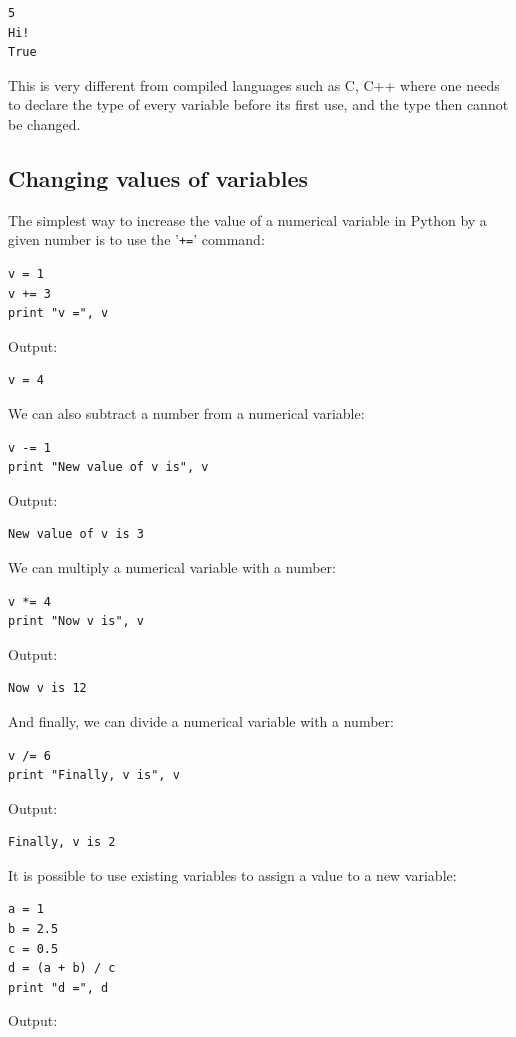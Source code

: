 \begin{verbatim}
5
Hi!
True
\end{verbatim}
This is very different from compiled languages such as C, C++ where one needs to declare the type 
of every variable before its first use, and the type then cannot be changed. 

\subsection{Changing values of variables}

The simplest way to increase the value of a numerical variable in Python by a given number 
is to use the '{\tt +=}' command:

\begin{verbatim}
v = 1
v += 3
print "v =", v
\end{verbatim}
Output:

\begin{verbatim}
v = 4
\end{verbatim}
We can also subtract a number from a numerical variable:

\begin{verbatim}
v -= 1
print "New value of v is", v
\end{verbatim}
Output:

\begin{verbatim}
New value of v is 3
\end{verbatim}
We can multiply a numerical variable with a number:

\begin{verbatim}
v *= 4
print "Now v is", v
\end{verbatim}
Output:

\begin{verbatim}
Now v is 12
\end{verbatim}
And finally, we can divide a numerical variable with a number:

\begin{verbatim}
v /= 6
print "Finally, v is", v
\end{verbatim}
Output:

\begin{verbatim}
Finally, v is 2
\end{verbatim}
It is possible to use existing variables to assign a value to a new variable:

\begin{verbatim}
a = 1
b = 2.5
c = 0.5
d = (a + b) / c
print "d =", d
\end{verbatim}
Output:


